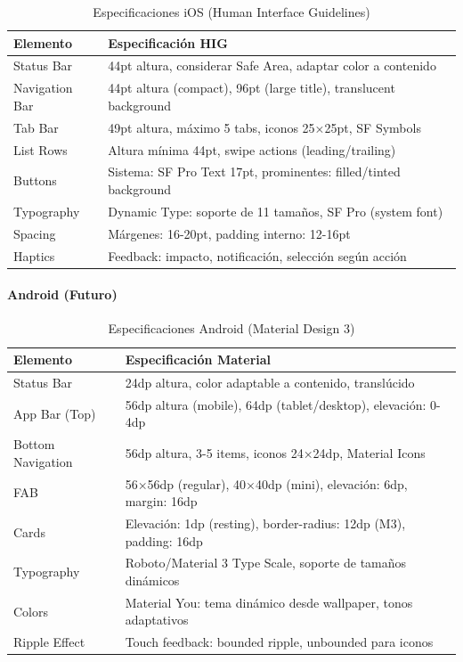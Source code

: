\documentclass[12pt,a4paper,oneside]{article}
\begin{document}
\begin{table}[h]
\centering
\caption{Especificaciones iOS (Human Interface Guidelines)}
\label{tab:ios-specs}
\small
\begin{tabular}{|l|p{9cm}|}
\hline
\textbf{Elemento} & \textbf{Especificación HIG} \\
\hline
Status Bar & 44pt altura, considerar Safe Area, adaptar color a contenido \\
\hline
Navigation Bar & 44pt altura (compact), 96pt (large title), translucent background \\
\hline
Tab Bar & 49pt altura, máximo 5 tabs, iconos 25×25pt, SF Symbols \\
\hline
List Rows & Altura mínima 44pt, swipe actions (leading/trailing) \\
\hline
Buttons & Sistema: SF Pro Text 17pt, prominentes: filled/tinted background \\
\hline
Typography & Dynamic Type: soporte de 11 tamaños, SF Pro (system font) \\
\hline
Spacing & Márgenes: 16-20pt, padding interno: 12-16pt \\
\hline
Haptics & Feedback: impacto, notificación, selección según acción \\
\hline
\end{tabular}
\end{table}

\paragraph{Android (Futuro)}

\begin{table}[h]
\centering
\caption{Especificaciones Android (Material Design 3)}
\label{tab:android-specs}
\small
\begin{tabular}{|l|p{9cm}|}
\hline
\textbf{Elemento} & \textbf{Especificación Material} \\
\hline
Status Bar & 24dp altura, color adaptable a contenido, translúcido \\
\hline
App Bar (Top) & 56dp altura (mobile), 64dp (tablet/desktop), elevación: 0-4dp \\
\hline
Bottom Navigation & 56dp altura, 3-5 items, iconos 24×24dp, Material Icons \\
\hline
FAB & 56×56dp (regular), 40×40dp (mini), elevación: 6dp, margin: 16dp \\
\hline
Cards & Elevación: 1dp (resting), border-radius: 12dp (M3), padding: 16dp \\
\hline
Typography & Roboto/Material 3 Type Scale, soporte de tamaños dinámicos \\
\hline
Colors & Material You: tema dinámico desde wallpaper, tonos adaptativos \\
\hline
Ripple Effect & Touch feedback: bounded ripple, unbounded para iconos \\
\hline
\end{tabular}
\end{table}
\end{document}
